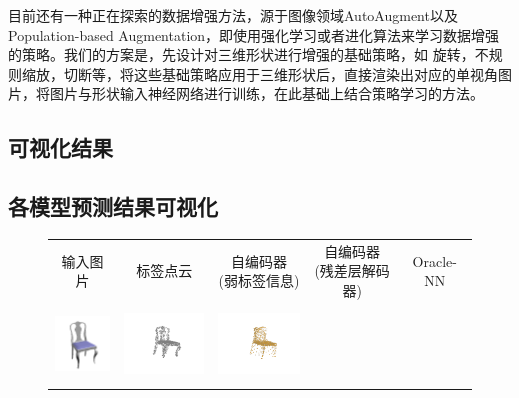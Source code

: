 \documentclass[bachelor, nocolorlinks, printoneside]{seuthesis} %
\begin{document}
\begin{Main}
目前还有一种正在探索的数据增强方法，源于图像领域AutoAugment以及Population-based Augmentation，即使用强化学习或者进化算法来学习数据增强的策略。我们的方案是，先设计对三维形状进行增强的基础策略，如
旋转，不规则缩放，切断等，将这些基础策略应用于三维形状后，直接渲染出对应的单视角图片，将图片与形状输入神经网络进行训练，在此基础上结合策略学习的方法。

\end{Main} %




\begin{Appendix}{}
    \chapter{可视化结果}
    \section{各模型预测结果可视化}
    \begin{figure}[!h]
        \centering
            \begin{tabular}{c@{}c@{}c@{}c@{}c@{}}
            输入图片 & 标签点云 & \makecell[c]{自编码器 \\(弱标签信息)} & \makecell[c]{自编码器 \\(残差层解码器)} & Oracle-NN\\
            \includegraphics[width=0.11\columnwidth,height=1.8cm]{figs/supp_real_dataset/Image/chair_fb8b45151900e6e016a0c57b9ceb6d01.png} &
            \includegraphics[width=0.18\columnwidth,height=2cm]{figs/supp_real_dataset/GT/chair_fb8b45151900e6e016a0c57b9ceb6d01_gt.png} &
            \includegraphics[width=0.18\columnwidth,height=2cm]{figs/supp_real_dataset/AE_label/chair_fb8b45151900e6e016a0c57b9ceb6d01_label.png} &

\end{tabular}
\end{figure}
\end{Appendix}
\end{document}
